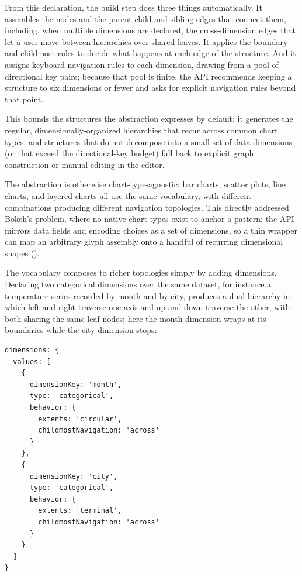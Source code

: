 \documentclass[12pt]{cmuthesis}
\begin{document}
\noindent From this declaration, the build step does three things automatically. It assembles the nodes and the parent-child and sibling edges that connect them, including, when multiple dimensions are declared, the cross-dimension edges that let a user move between hierarchies over shared leaves. It applies the boundary and childmost rules to decide what happens at each edge of the structure. And it assigns keyboard navigation rules to each dimension, drawing from a pool of directional key pairs; because that pool is finite, the API recommends keeping a structure to six dimensions or fewer and asks for explicit navigation rules beyond that point.

This bounds the structures the abstraction expresses by default: it generates the regular, dimensionally-organized hierarchies that recur across common chart types, and structures that do not decompose into a small set of data dimensions (or that exceed the directional-key budget) fall back to explicit graph construction or manual editing in the editor.

The abstraction is otherwise chart-type-agnostic: bar charts, scatter plots, line charts, and layered charts all use the same vocabulary, with different combinations producing different navigation topologies. This directly addressed Bokeh's problem, where no native chart types exist to anchor a pattern: the API mirrors data fields and encoding choices as a set of dimensions, so a thin wrapper can map an arbitrary glyph assembly onto a handful of recurring dimensional shapes ().

The vocabulary composes to richer topologies simply by adding dimensions. Declaring two categorical dimensions over the same dataset, for instance a temperature series recorded by month and by city, produces a dual hierarchy in which left and right traverse one axis and up and down traverse the other, with both sharing the same leaf nodes; here the month dimension wraps at its boundaries while the city dimension stops:

\begin{verbatim}
dimensions: {
  values: [
    {
      dimensionKey: 'month',
      type: 'categorical',
      behavior: {
        extents: 'circular',
        childmostNavigation: 'across'
      }
    },
    {
      dimensionKey: 'city',
      type: 'categorical',
      behavior: {
        extents: 'terminal',
        childmostNavigation: 'across'
      }
    }
  ]
}
\end{verbatim}
\end{document}
